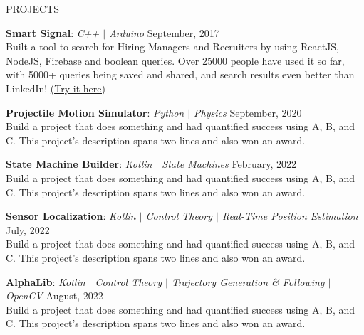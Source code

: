 \documentclass{resume} %
\begin{document}

    \begin{rSection}{PROJECTS}
        \vspace{-1.25em}
        \item \textbf{Smart Signal}: \textit{C++ $\vert$ Arduino} \hfill {September, 2017}\\
        {Built a tool to search for Hiring Managers and Recruiters by using ReactJS, NodeJS, Firebase and boolean queries. Over 25000 people have used it so far, with 5000+ queries being saved and shared, and search results even better than LinkedIn! \href{https://hiring-search.careerflow.ai/}{(Try it here)}}

        \item \textbf{Projectile Motion Simulator}: \textit{Python $\vert$ Physics} \hfill {September, 2020}\\
        {Build a project that does something and had quantified success using A, B, and C. This project's description spans two lines and also won an award.}

        \item \textbf{State Machine Builder}: \textit{Kotlin $\vert$ State Machines} \hfill {February, 2022}\\
        {Build a project that does something and had quantified success using A, B, and C. This project's description spans two lines and also won an award.}

        \item \textbf{Sensor Localization}: \textit{Kotlin $\vert$ Control Theory $\vert$ Real-Time Position Estimation} \hfill {July, 2022}\\
        {Build a project that does something and had quantified success using A, B, and C. This project's description spans two lines and also won an award.}

        \item \textbf{AlphaLib}: \textit{Kotlin $\vert$ Control Theory $\vert$ Trajectory Generation \& Following $\vert$ OpenCV} \hfill {August, 2022}\\
        {Build a project that does something and had quantified success using A, B, and C. This project's description spans two lines and also won an award.}
    \end{rSection} 
\end{document}
